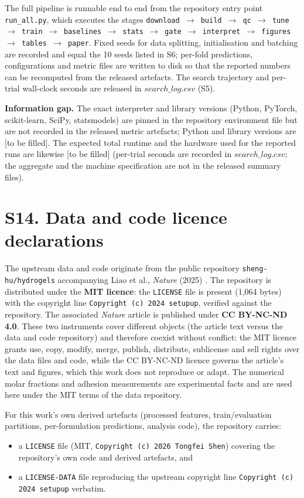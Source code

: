 \documentclass[utf8]{frontiers_suppmat}
\begin{document}
The full pipeline is runnable end to end from the repository entry point \texttt{run\_all.py}, which executes the stages \texttt{download $\rightarrow$ build $\rightarrow$ qc $\rightarrow$ tune $\rightarrow$ train $\rightarrow$ baselines $\rightarrow$ stats $\rightarrow$ gate $\rightarrow$ interpret $\rightarrow$ figures $\rightarrow$ tables $\rightarrow$ paper}. Fixed seeds for data splitting, initialisation and batching are recorded and equal the 10 seeds listed in S6; per-fold predictions, configurations and metric files are written to disk so that the reported numbers can be recomputed from the released artefacts. The search trajectory and per-trial wall-clock seconds are released in $search\_log.csv$ (S5).

\textbf{Information gap.} The exact interpreter and library versions (Python, PyTorch, scikit-learn, SciPy, statsmodels) are pinned in the repository environment file but are not recorded in the released metric artefacts; Python and library versions are {[}to be filled{]}. The expected total runtime and the hardware used for the reported runs are likewise {[}to be filled{]} (per-trial seconds are recorded in $search\_log.csv$; the aggregate and the machine specification are not in the released summary files).

\section{S14. Data and code licence declarations}

The upstream data and code originate from the public repository \texttt{sheng-hu/hydrogels} accompanying Liao et al., \textit{Nature} (2025) \cite{liao2025nature}. The repository is distributed under the \textbf{MIT licence}: the \texttt{LICENSE} file is present (1,064 bytes) with the copyright line \texttt{Copyright (c) 2024 setupup}, verified against the repository. The associated \textit{Nature} article is published under \textbf{CC BY-NC-ND 4.0}. These two instruments cover different objects (the article text versus the data and code repository) and therefore coexist without conflict: the MIT licence grants use, copy, modify, merge, publish, distribute, sublicense and sell rights over the data files and code, while the CC BY-NC-ND licence governs the article's text and figures, which this work does not reproduce or adapt. The numerical molar fractions and adhesion measurements are experimental facts and are used here under the MIT terms of the data repository.

For this work's own derived artefacts (processed features, train/evaluation partitions, per-formulation predictions, analysis code), the repository carries:
\begin{itemize}
\item a \texttt{LICENSE} file (MIT, \texttt{Copyright (c) 2026 Tongfei Shen}) covering the repository's own code and derived artefacts, and
\item a \texttt{LICENSE-DATA} file reproducing the upstream copyright line \texttt{Copyright (c) 2024 setupup} verbatim.
\end{itemize}
\end{document}
